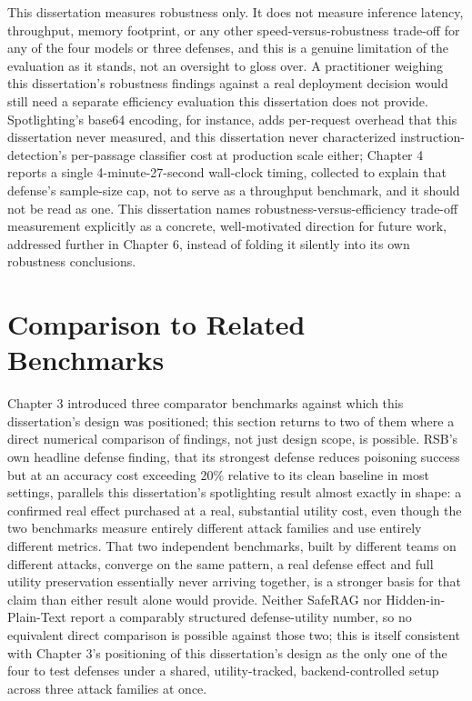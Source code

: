 This dissertation measures robustness only. It does not measure
inference latency, throughput, memory footprint, or any other
speed-versus-robustness trade-off for any of the four models or three
defenses, and this is a genuine limitation of the evaluation as it
stands, not an oversight to gloss over. A practitioner weighing this
dissertation's robustness findings against a real deployment decision
would still need a separate efficiency evaluation this dissertation does
not provide. Spotlighting's base64 encoding, for instance, adds
per-request overhead that this dissertation never measured, and this
dissertation never characterized instruction-detection's per-passage
classifier cost at production scale either; Chapter 4 reports a single
4-minute-27-second wall-clock timing, collected to explain that
defense's sample-size cap, not to serve as a throughput benchmark, and
it should not be read as one. This dissertation names
robustness-versus-efficiency trade-off measurement explicitly as a
concrete, well-motivated direction for future work, addressed further in
Chapter 6, instead of folding it silently into its own robustness
conclusions.

\section{Comparison to Related Benchmarks}

Chapter 3 introduced three comparator benchmarks against which this
dissertation's design was positioned; this section returns to two of
them where a direct numerical comparison of findings, not just design
scope, is possible. RSB's own headline defense finding, that its
strongest defense reduces poisoning success but at an accuracy cost
exceeding 20\% relative to its clean baseline in most settings, parallels
this dissertation's spotlighting result almost exactly in shape: a
confirmed real effect purchased at a real, substantial utility cost,
even though the two benchmarks measure entirely different attack
families and use entirely different metrics. That two independent
benchmarks, built by different teams on different attacks, converge on
the same pattern, a real defense effect and full utility preservation
essentially never arriving together, is a stronger basis for that claim
than either result alone would provide. Neither SafeRAG nor
Hidden-in-Plain-Text report a comparably structured defense-utility
number, so no equivalent direct comparison is possible against those two;
this is itself consistent with Chapter 3's positioning of this
dissertation's design as the only one of the four to test defenses under
a shared, utility-tracked, backend-controlled setup across three attack
families at once.


